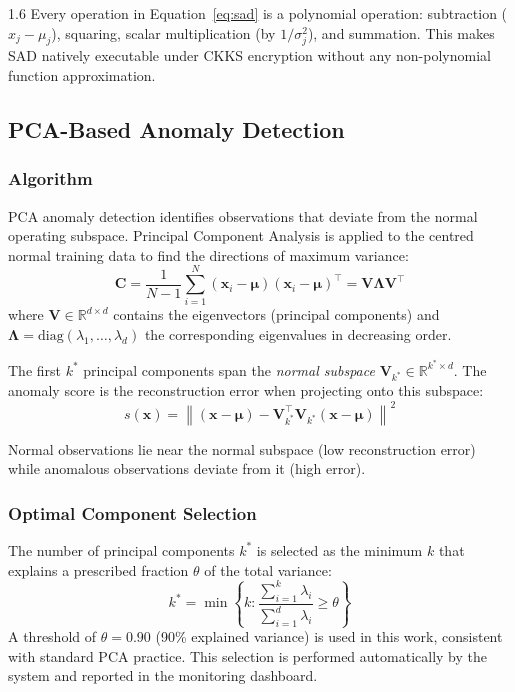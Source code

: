 \begin{spacing}{1.6}
Every operation in Equation~\eqref{eq:sad} is a polynomial operation:
subtraction ($x_j - \mu_j$), squaring, scalar multiplication (by
$1/\sigma_j^2$), and summation. This makes SAD natively executable under
CKKS encryption without any non-polynomial function approximation.

\subsection{PCA-Based Anomaly Detection}

\subsubsection{Algorithm}

PCA anomaly detection identifies observations that deviate from the normal
operating subspace. Principal Component Analysis is applied to the centred
normal training data to find the directions of maximum variance:
\begin{equation}
  \mathbf{C} = \frac{1}{N-1} \sum_{i=1}^N (\mathbf{x}_i - \boldsymbol{\mu})
  (\mathbf{x}_i - \boldsymbol{\mu})^\top = \mathbf{V} \mathbf{\Lambda}
  \mathbf{V}^\top
\end{equation}
where $\mathbf{V} \in \mathbb{R}^{d \times d}$ contains the eigenvectors
(principal components) and $\mathbf{\Lambda} = \mathrm{diag}(\lambda_1,
\ldots, \lambda_d)$ the corresponding eigenvalues in decreasing order.

The first $k^*$ principal components span the \textit{normal subspace}
$\mathbf{V}_{k^*} \in \mathbb{R}^{k^* \times d}$. The anomaly score is the
reconstruction error when projecting onto this subspace:
\begin{equation}
  s(\mathbf{x}) = \left\| (\mathbf{x} - \boldsymbol{\mu}) -
  \mathbf{V}_{k^*}^\top \mathbf{V}_{k^*} (\mathbf{x} - \boldsymbol{\mu})
  \right\|^2
  \label{eq:pca}
\end{equation}

Normal observations lie near the normal subspace (low reconstruction error)
while anomalous observations deviate from it (high error).

\subsubsection{Optimal Component Selection}

The number of principal components $k^*$ is selected as the minimum $k$ that
explains a prescribed fraction $\theta$ of the total variance:
\begin{equation}
  k^* = \min \left\{ k : \frac{\sum_{i=1}^k \lambda_i}
  {\sum_{i=1}^d \lambda_i} \geq \theta \right\}
  \label{eq:optk}
\end{equation}
A threshold of $\theta = 0.90$ (90\% explained variance) is used in this work,
consistent with standard PCA practice. This selection is performed automatically
by the system and reported in the monitoring dashboard.


\end{spacing}
